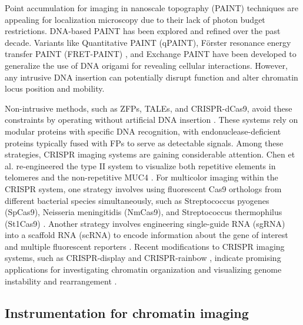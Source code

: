 Point accumulation for imaging in nanoscale topography (PAINT) techniques are appealing for localization microscopy due to their lack of photon budget restrictions. DNA-based PAINT \parencite{Jungmann2016} has been explored and refined over the past decade. Variants like Quantitative PAINT (qPAINT), Förster resonance energy transfer PAINT (FRET-PAINT) \parencite{Jungmann2016}, and Exchange PAINT have been developed to generalize the use of DNA origami for revealing cellular interactions. However, any intrusive DNA insertion can potentially disrupt function and alter chromatin locus position and mobility. 

Non-intrusive methods, such as ZFPs, TALEs, and CRISPR-dCas9, avoid these constraints by operating without artificial DNA insertion \parencite{Chen2016,Lindhout2007,Ma2013}. These systems rely on modular proteins with specific DNA recognition, with endonuclease-deficient proteins typically fused with FPs to serve as detectable signals. Among these strategies, CRISPR imaging systems are gaining considerable attention. Chen et al. re-engineered the type II system to visualize both repetitive elements in telomeres and the non-repetitive MUC4 \parencite{Chen2013}. For multicolor imaging within the CRISPR system, one strategy involves using fluorescent Cas9 orthologs from different bacterial species simultaneously, such as Streptococcus pyogenes (SpCas9), Neisseria meningitidis (NmCas9), and Streptococcus thermophilus (St1Cas9) \parencite{Ma2015}. Another strategy involves engineering single-guide RNA (sgRNA) into a scaffold RNA (scRNA) to encode information about the gene of interest and multiple fluorescent reporters \parencite{Zalatan2015}. Recent modifications to CRISPR imaging systems, such as CRISPR-display \parencite{Shechner2015} and CRISPR-rainbow \parencite{Ma2016}, indicate promising applications for investigating chromatin organization and visualizing genome instability and rearrangement \parencite{Chen2016}.


\subsection{Instrumentation for chromatin imaging}

